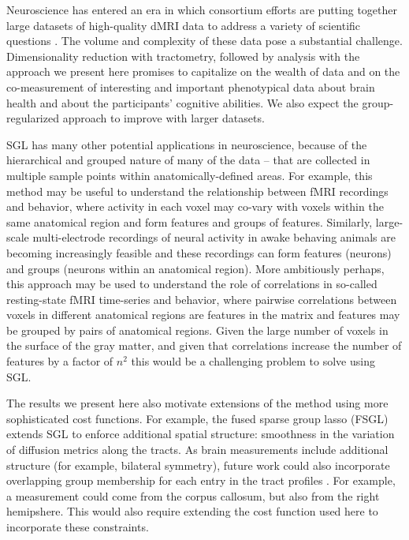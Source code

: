Neuroscience has entered an era in which consortium efforts are putting together
large datasets of high-quality dMRI data to address a variety of scientific
questions \cite{jernigan2016ping, jernigan2018abcd, alexander2017open,
Miller2016-hw, VanEssen2012}. The volume and complexity of these data pose a
substantial challenge. Dimensionality reduction with tractometry, followed by
analysis with the approach we present here promises to capitalize on the wealth
of data and on the co-measurement of interesting and important phenotypical data
about brain health and about the participants' cognitive abilities. We also
expect the group-regularized approach to improve with larger datasets.

SGL has many other potential applications in neuroscience, because of the
hierarchical and grouped nature of many of the data -- that are collected in
multiple sample points within anatomically-defined areas. For example, this
method may be useful to understand the relationship between fMRI recordings and
behavior, where activity in each voxel may co-vary with voxels within the same
anatomical region and form features and groups of features. Similarly,
large-scale multi-electrode recordings of neural activity in awake behaving
animals are becoming increasingly feasible \cite{steinmetz2018distributed,
Jun2017-gv} and these recordings can form features (neurons) and groups (neurons
within an anatomical region). More ambitiously perhaps, this approach may be
used to understand the role of correlations in so-called resting-state fMRI
time-series and behavior, where pairwise correlations between voxels in
different anatomical regions are features in the matrix and features may be
grouped by pairs of anatomical regions. Given the large number of voxels in the
surface of the gray matter, and given that correlations increase the number of
features by a factor of $n^2$ this would be a challenging problem to solve using
SGL.

The results we present here also motivate extensions of the method using more
sophisticated cost functions. For example, the fused sparse group lasso (FSGL)
\cite{zhou2012} extends SGL to enforce additional spatial structure: smoothness
in the variation of diffusion metrics along the tracts. As brain measurements
include additional structure (for example, bilateral symmetry), future work
could also incorporate overlapping group membership for each entry in the tract
profiles \cite{Rao2014-xm}. For example, a measurement could come from the
corpus callosum, but also from the right hemipshere. This would also require
extending the cost function used here to incorporate these constraints.

